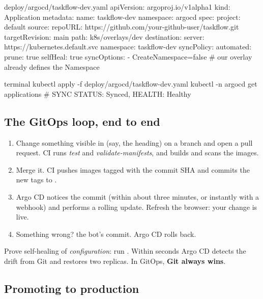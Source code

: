 \begin{yamlcode}{deploy/argocd/taskflow-dev.yaml}
apiVersion: argoproj.io/v1alpha1
kind: Application
metadata:
  name: taskflow-dev
  namespace: argocd
spec:
  project: default
  source:
    repoURL: https://github.com/your-github-user/taskflow.git
    targetRevision: main
    path: k8s/overlays/dev
  destination:
    server: https://kubernetes.default.svc
    namespace: taskflow-dev
  syncPolicy:
    automated:
      prune: true
      selfHeal: true
    syncOptions:
      - CreateNamespace=false          # our overlay already defines the Namespace
\end{yamlcode}

\begin{bashcode}{terminal}
kubectl apply -f deploy/argocd/taskflow-dev.yaml
kubectl -n argocd get applications            # SYNC STATUS: Synced, HEALTH: Healthy
\end{bashcode}

\subsection{The GitOps loop, end to end}

\begin{enumerate}
  \item Change something visible in  (say, the heading) on a
        branch and open a pull request. CI runs \emph{test} and
        \emph{validate-manifests}, and builds and scans the images.
  \item Merge it. CI pushes images tagged with the commit SHA and commits the
        new tags to .
  \item Argo CD notices the commit (within about three minutes, or instantly with
        a webhook) and performs a rolling update. Refresh the browser: your
        change is live.
  \item Something wrong?  the bot's commit. Argo CD rolls back.
\end{enumerate}

\begin{tryit}
Prove self-healing of \emph{configuration}: run
. Within seconds
Argo CD detects the drift from Git and restores two replicas. In GitOps,
\textbf{Git always wins}.
\end{tryit}

\subsection{Promoting to production}

